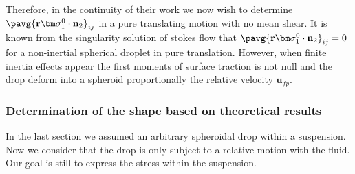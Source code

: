 Therefore, in the continuity of their work we now wish to determine $\pavg{\textbf{r}\bm\sigma_1^0\cdot\textbf{n}_2}_{ij}$ in a pure translating motion with no mean shear. 
It is known from the singularity solution of stokes flow that $\pavg{\textbf{r}\bm\sigma_1^0\cdot\textbf{n}_2}_{ij} = 0$ for a non-inertial spherical droplet in pure translation. 
However, when finite inertia effects appear the first moments of surface traction is not null and the drop deform into a spheroid proportionally the relative velocity $\textbf{u}_{fp}$. 


\subsubsection*{Determination of the shape based on \citet{taylor1964deformation} theoretical results}

In the last section we assumed an arbitrary spheroidal drop within a suspension. 
Now we consider that the drop is only subject to a relative motion with the fluid. 
Our goal is still to express the stress within the suspension. 

